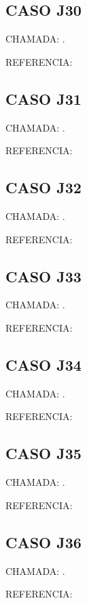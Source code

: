 \documentclass{undftex}
\begin{document}
\begin{refsection}\section*{CASO J30} CHAMADA: . \textcite{j30}\par REFERENCIA:\par\printbibliography[heading=none,check=undfconsultadas]\end{refsection}\clearpage
\begin{refsection}\section*{CASO J31} CHAMADA: . \textcite{j31}\par REFERENCIA:\par\printbibliography[heading=none,check=undfconsultadas]\end{refsection}\clearpage
\begin{refsection}\section*{CASO J32} CHAMADA: . \textcite{j32}\par REFERENCIA:\par\printbibliography[heading=none,check=undfconsultadas]\end{refsection}\clearpage
\begin{refsection}\section*{CASO J33} CHAMADA: . \textcite{j33}\par REFERENCIA:\par\printbibliography[heading=none,check=undfconsultadas]\end{refsection}\clearpage
\begin{refsection}\section*{CASO J34} CHAMADA: . \textcite{j34}\par REFERENCIA:\par\printbibliography[heading=none,check=undfconsultadas]\end{refsection}\clearpage
\begin{refsection}\section*{CASO J35} CHAMADA: . \textcite{j35}\par REFERENCIA:\par\printbibliography[heading=none,check=undfconsultadas]\end{refsection}\clearpage
\begin{refsection}\section*{CASO J36} CHAMADA: . \textcite{j22a}\par REFERENCIA:\par\printbibliography[heading=none,check=undfconsultadas]\end{refsection}\clearpage
\end{document}
